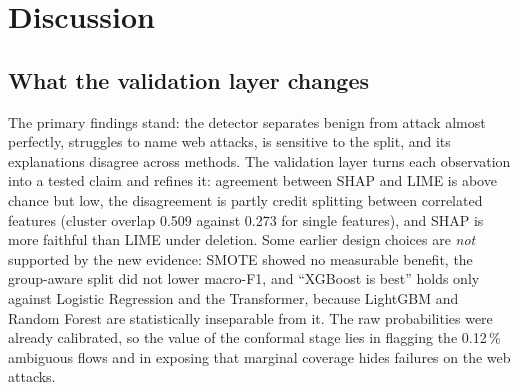 \documentclass[11pt,a4paper]{article}
\begin{document}
\section{Discussion}
\label{sec:discussion}

\subsection{What the validation layer changes}
The primary findings stand: the detector separates benign from attack almost perfectly, struggles to name web attacks, is sensitive to the split, and its explanations disagree across methods. The validation layer turns each observation into a tested claim and refines it: agreement between SHAP and LIME is above chance but low, the disagreement is partly credit splitting between correlated features (cluster overlap 0.509 against 0.273 for single features), and SHAP is more faithful than LIME under deletion. Some earlier design choices are \emph{not} supported by the new evidence: SMOTE showed no measurable benefit, the group-aware split did not lower macro-F1, and ``XGBoost is best'' holds only against Logistic Regression and the Transformer, because LightGBM and Random Forest are statistically inseparable from it. The raw probabilities were already calibrated, so the value of the conformal stage lies in flagging the 0.12\,\% ambiguous flows and in exposing that marginal coverage hides failures on the web attacks.
\end{document}
